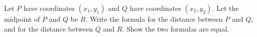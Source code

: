 \begin{frame}
\begin{example}
Let $P$ have coordinates $(x_1, y_1)$ and $Q$ have coordinates $(x_2, y_2)$. Let the midpoint of $P$ and $Q$ be $R$. Write the formula for the distance between $P$ and $Q$, and for the distance between $Q$ and $R$. Show the two formulas are equal.
\end{example}


\end{frame}